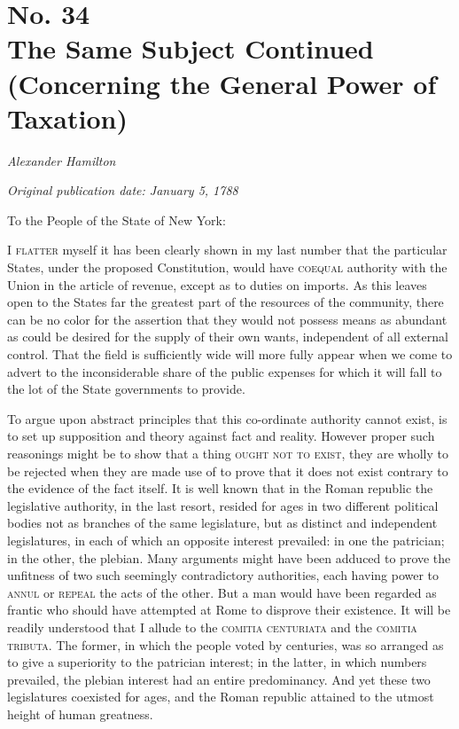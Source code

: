 \chapter[No. 34: The Same Subject Continued (Concerning the General Power of Taxation)]{No. 34\\ {\small The Same Subject Continued (Concerning the General Power of Taxation)}}

\textit{Alexander Hamilton}

\textit{Original publication date: January 5, 1788}
\vspace{1cm}

To the People of the State of New York:
\vspace{.4cm}

\textsc{I flatter} myself it has been clearly shown in my last number that the particular States, under the proposed Constitution, would have \textsc{coequal} authority with the Union in the article of revenue, except as to duties on imports. 
As this leaves open to the States far the greatest part of the resources of the community, there can be no color for the assertion that they would not possess means as abundant as could be desired for the supply of their own wants, independent of all external control. 
That the field is sufficiently wide will more fully appear when we come to advert to the inconsiderable share of the public expenses for which it will fall to the lot of the State governments to provide.

To argue upon abstract principles that this co-ordinate authority cannot exist, is to set up supposition and theory against fact and reality. 
However proper such reasonings might be to show that a thing \textsc{ought not to exist}, they are wholly to be rejected when they are made use of to prove that it does not exist contrary to the evidence of the fact itself. 
It is well known that in the Roman republic the legislative authority, in the last resort, resided for ages in two different political bodies not as branches of the same legislature, but as distinct and independent legislatures, in each of which an opposite interest prevailed: in one the patrician; in the other, the plebian. 
Many arguments might have been adduced to prove the unfitness of two such seemingly contradictory authorities, each having power to \textsc{annul} or \textsc{repeal} the acts of the other. 
But a man would have been regarded as frantic who should have attempted at Rome to disprove their existence. 
It will be readily understood that I allude to the \textsc{comitia centuriata} and the \textsc{comitia tributa}. 
The former, in which the people voted by centuries, was so arranged as to give a superiority to the patrician interest; in the latter, in which numbers prevailed, the plebian interest had an entire predominancy. 
And yet these two legislatures coexisted for ages, and the Roman republic attained to the utmost height of human greatness.

